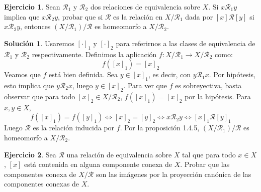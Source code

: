 \documentclass{article}
\theoremstyle{plain}
\theoremstyle{definition}
\newtheorem{exercise}{Ejercicio}
\newtheorem*{sol*}{Solución}
\begin{document}
\newpage
\begin{exercise}
Sean $\mathcal{R}_1$ y $\mathcal{R}_2$ dos relaciones de equivalencia sobre $X$. Si $x \mathcal{R}_1 y$ implica que $x \mathcal{R}_2 y$, probar que si $\mathcal{R}$ es la relación en $X/\mathcal{R}_1$ dada por $[x] \mathcal{R} [y]$ si $x \mathcal{R}_2 y$, entonces $(X/\mathcal{R}_1)/\mathcal{R}$ es homeomorfo a $X / \mathcal{R}_2$.
\end{exercise}
\begin{sol*}
Usaremos $[\cdot]_1$ y $[\cdot]_2$ para referirnos a las clases de equivalencia de $\mathcal{R}_1$ y $\mathcal{R}_2$ respectivamente. Definimos la aplicación $f : X/\mathcal{R}_1 \to X/\mathcal{R}_2$ como:
\[ f ([x]_1) = [x]_2 \]
Veamos que $f$ está bien definida. Sea $y \in [x]_1$, es decir, con $y \mathcal{R}_1 x$. Por hipótesis, esto implica que $y \mathcal{R}_2 x$, luego $y \in [x]_2$. Para ver que $f$ es sobreyectiva, basta observar que para todo $[x]_2 \in X/\mathcal{R}_2$, $f([x]_1) = [x]_2$ por la hipótesis. Para $x,y \in X$, 
	\[ f([x]_1) = f([y]_1) \Leftrightarrow [x]_2 = [y]_2 \Leftrightarrow x \mathcal{R}_2 y \Leftrightarrow [x]_1 \mathcal{R} [y]_1 \]
	Luego $\mathcal{R}$ es la relación inducida por $f$. Por la proposición 1.4.5,  $(X/\mathcal{R}_1)/\mathcal{R}$ es homeomorfo a $X/\mathcal{R}_2$.
\end{sol*}

\newpage
\begin{exercise}
Sea $\mathcal{R}$ una relación de equivalencia sobre $X$ tal que para todo $x \in X$, $[x]$ está contenida en alguna componente conexa de $X$. Probar que las componentes conexa de $X/\mathcal{R}$ son las imágenes por la proyección canónica de las componentes conexas de $X$.
\end{exercise}
\end{document}
